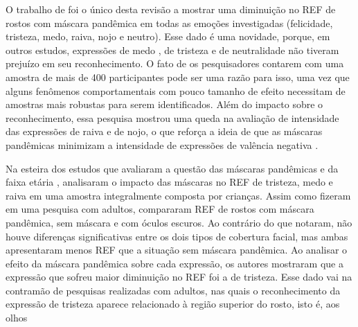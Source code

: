 \documentclass[portuguese]{textolivre}
\begin{document}
O trabalho de \textcite{pazhoohi_facial_2021} foi o único desta revisão a mostrar uma diminuição no REF de rostos com máscara pandêmica em todas as emoções investigadas (felicidade, tristeza, medo, raiva, nojo e neutro). Esse dado é uma novidade, porque, em outros estudos, expressões de medo \cite{carbon_wearing_2020}, de tristeza \cite{noyes_effect_2021} e de neutralidade \cite{carbon_wearing_2020, marini_impact_2021, noyes_effect_2021} não tiveram prejuízo em seu reconhecimento. O fato de os pesquisadores contarem com uma amostra de mais de 400 participantes pode ser uma razão para isso, uma vez que alguns fenômenos comportamentais com pouco tamanho de efeito necessitam de amostras mais robustas para serem identificados. Além do impacto sobre o reconhecimento, essa pesquisa mostrou uma queda na avaliação de intensidade das expressões de raiva e de nojo, o que reforça a ideia de que as máscaras pandêmicas minimizam a intensidade de expressões de valência negativa \cite{grundmann_face_2020, parada-fernandez_wearing_2022}.


Na esteira dos estudos que avaliaram a questão das máscaras pandêmicas e da faixa etária , \textcite{ruba_childrens_2020} analisaram o impacto das máscaras no REF de tristeza, medo e raiva em uma amostra integralmente composta por crianças. Assim como  \textcite{noyes_effect_2021} fizeram em uma pesquisa com adultos, \textcite{ruba_childrens_2020} compararam REF de rostos com máscara pandêmica, sem máscara e com óculos escuros. Ao contrário do que \textcite{noyes_effect_2021} notaram, não houve diferenças significativas entre os dois tipos de cobertura facial, mas ambas apresentaram menos REF que a situação sem máscara pandêmica. Ao analisar o efeito da máscara pandêmica sobre cada expressão, os autores mostraram que a expressão que sofreu maior diminuição no REF foi a de tristeza. Esse dado vai na contramão de pesquisas realizadas com adultos, nas quais o reconhecimento da expressão de tristeza aparece relacionado à região superior do rosto, isto é, aos olhos \cite{calvo_facial_2014, noyes_effect_2021, wegrzyn_mapping_2017}
\end{document}
